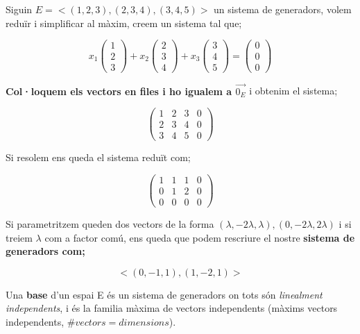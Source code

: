 \documentclass[12pt]{article}
\begin{document}
\begin{examplebox}{}
    Siguin $E = <(1,2,3), (2,3,4), (3,4,5)>$ un sistema de generadors, volem reduïr i simplificar al màxim, creem un sistema tal que;

    \[x_1 \begin{pmatrix}
        1\\
        2\\
        3
    \end{pmatrix} + x_2\begin{pmatrix}
        2\\
        3\\
        4
    \end{pmatrix} + x_3 \begin{pmatrix}
        3\\
        4\\
        5
    \end{pmatrix} = \begin{pmatrix}
        0\\
        0\\
        0
    \end{pmatrix}\]

    \textbf{Col·loquem els vectors en files i ho igualem a $\vec{0_E}$} i obtenim el sistema;

    \[
    \begin{pmatrix}
        1 & 2 & 3 & 0 \\
        2 & 3 & 4 & 0 \\
        3 & 4 & 5 & 0 
    \end{pmatrix}
    \]

    Si resolem ens queda el sistema reduït com;

    \[
    \begin{pmatrix}
        1 & 1 & 1 & 0 \\
        0 & 1 & 2 & 0 \\
        0 & 0 & 0 & 0 
    \end{pmatrix}
    \]

    Si parametritzem queden dos vectors de la forma $(\lambda, -2\lambda, \lambda), (0, -2\lambda, 2\lambda)$ i si treiem $\lambda$ com a factor comú, ens queda que podem rescriure el nostre \textbf{sistema de generadors com;}

    \[<(0,-1,1), (1,-2,1)>\]
\end{examplebox}

Una \textbf{base} d'un espai E és un sistema de generadors on tots són \textit{linealment independents}, i és la familia màxima de vectors independents (màxims vectors independents, $\#vectors = dimensions$).
\end{document}
